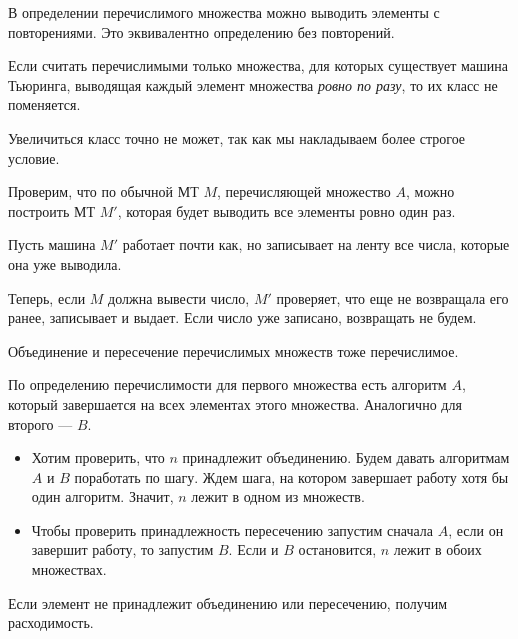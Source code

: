 \begin{probl}
    В определении перечислимого множества можно выводить элементы с повторениями. Это эквивалентно определению без повторений. 
\end{probl}
\begin{thm}
	Если считать перечислимыми только множества, для которых существует машина Тьюринга, выводящая каждый элемент множества \textit{ровно по разу}, то их класс не поменяется.
\end{thm}
\begin{proof*}
	Увеличиться класс точно не может, так как мы накладываем более строгое условие.

	Проверим, что по обычной МТ $ M$, перечисляющей множество $ A$, можно построить МТ $ M'$, которая будет выводить все элементы ровно один раз.

	Пусть машина $ M'$ работает почти как, но записывает на ленту все числа, которые она уже выводила.

	Теперь, если $ M$ должна вывести число, $ M'$ проверяет, что еще не возвращала его ранее, записывает и выдает.
	Если число уже записано, возвращать не будем.
\end{proof*}

\begin{thm}
    Объединение и пересечение перечислимых множеств тоже перечислимое.
\end{thm}
\begin{proof*}
    По определению перечислимости для первого множества есть алгоритм $ A$, который завершается на всех элементах этого множества. Аналогично для второго --- $ B$.

    \begin{itemize}
	\item Хотим проверить, что $ n$ принадлежит объединению. Будем давать алгоритмам  $ A$ и $ B$ поработать по шагу. Ждем шага, на котором завершает работу хотя бы один алгоритм. Значит, $ n$ лежит в одном из множеств. 
	\item Чтобы проверить принадлежность пересечению запустим сначала $ A$, если он завершит работу, то запустим $ B$. Если и $ B$ остановится, $ n $ лежит в обоих множествах.
    \end{itemize}
    Если элемент не принадлежит объединению или пересечению, получим расходимость.
\end{proof*}


